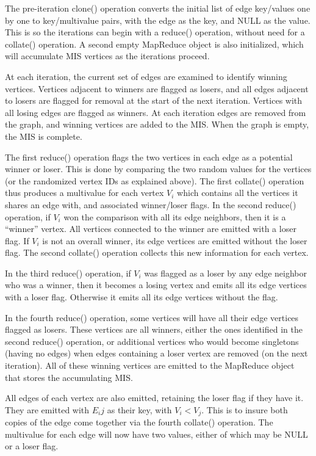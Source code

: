 The pre-iteration clone() operation converts the initial list of edge
key/values one by one to key/multivalue pairs, with the edge as the
key, and NULL as the value.  This is so the iterations can begin with
a reduce() operation, without need for a collate() operation.  A
second empty MapReduce object is also initialized, which will
accumulate MIS vertices as the iterations proceed.

At each iteration, the current set of edges are examined to identify
winning vertices.  Vertices adjacent to winners are flagged as losers,
and all edges adjacent to losers are flagged for removal at the start
of the next iteration.  Vertices with all losing edges are flagged as
winners.  At each iteration edges are removed from the graph, and
winning vertices are added to the MIS.  When the graph is empty, the
MIS is complete.

The first reduce() operation flags the two vertices in each edge as a
potential winner or loser.  This is done by comparing the two random
values for the vertices (or the randomized vertex IDs as explained
above).  The first collate() operation thus produces a multivalue for
each vertex $V_i$ which contains all the vertices it shares an edge
with, and associated winner/loser flags.  In the second reduce()
operation, if $V_i$ won the comparison with all its edge neighbors,
then it is a ``winner'' vertex.  All vertices connected to the winner
are emitted with a loser flag.  If $V_i$ is not an overall winner, its
edge vertices are emitted without the loser flag.  The second
collate() operation collects this new information for each vertex.

In the third reduce() operation, if $V_i$ was flagged as a loser by
any edge neighbor who was a winner, then it becomes a losing vertex
and emits all its edge vertices with a loser flag.  Otherwise it emits
all its edge vertices without the flag.

In the fourth reduce() operation, some vertices will have all their
edge vertices flagged as losers.  These vertices are all winners,
either the ones identified in the second reduce() operation, or
additional vertices who would become singletons (having no edges) when
edges containing a loser vertex are removed (on the next iteration).
All of these winning vertices are emitted to the MapReduce object that
stores the accumulating MIS.

All edges of each vertex are also emitted, retaining the loser flag if
they have it.  They are emitted with $E_ij$ as their key, with $V_i <
V_j$.  This is to insure both copies of the edge come together via the
fourth collate() operation.  The multivalue for each edge will now
have two values, either of which may be NULL or a loser flag.

